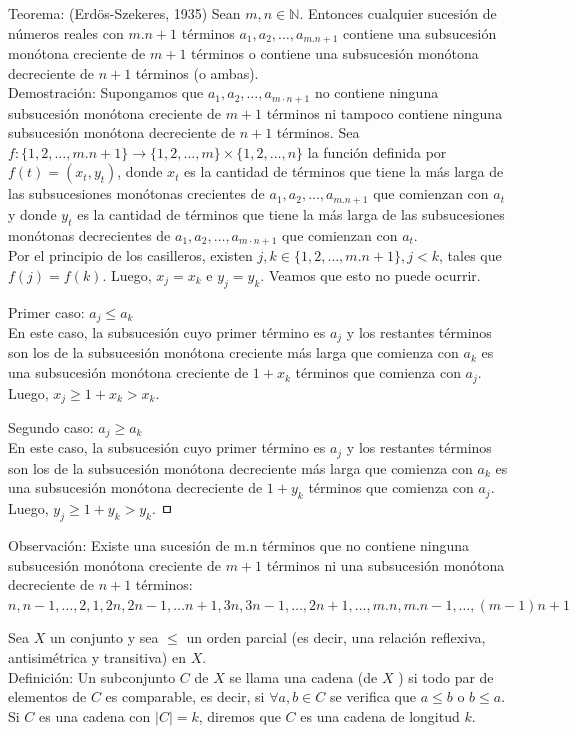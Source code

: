 \documentclass[10pt]{article}
\begin{document}
Teorema: (Erdös-Szekeres, 1935) Sean $m, n \in \mathbb{N}$. Entonces cualquier sucesión de números reales con $m . n+1$ términos $a_{1}, a_{2}, \ldots, a_{m . n+1}$ contiene una subsucesión monótona creciente de $m+1$ términos o contiene una subsucesión monótona decreciente de $n+1$ términos (o ambas).\\
Demostración: Supongamos que $a_{1}, a_{2}, \ldots, a_{m \cdot n+1}$ no contiene ninguna subsucesión monótona creciente de $m+1$ términos ni tampoco contiene ninguna subsucesión monótona decreciente de $n+1$ términos. Sea $f:\{1,2, \ldots, m . n+1\} \longrightarrow\{1,2, \ldots, m\} \times\{1,2, \ldots, n\}$ la función definida por $f(t)=\left(x_{t}, y_{t}\right)$, donde $x_{t}$ es la cantidad de términos que tiene la más larga de las subsucesiones monótonas crecientes de $a_{1}, a_{2}, \ldots, a_{m . n+1}$ que comienzan con $a_{t}$ y donde $y_{t}$ es la cantidad de términos que tiene la más larga de las subsucesiones monótonas decrecientes de $a_{1}, a_{2}, \ldots, a_{m \cdot n+1}$ que comienzan con $a_{t}$.\\
Por el principio de los casilleros, existen $j, k \in\{1,2, \ldots, m . n+1\}, j<k$, tales que $f(j)=f(k)$. Luego, $x_{j}=x_{k}$ e $y_{j}=y_{k}$. Veamos que esto no puede ocurrir.

Primer caso: $a_{j} \leq a_{k}$\\
En este caso, la subsucesión cuyo primer término es $a_{j}$ y los restantes términos son los de la subsucesión monótona creciente más larga que comienza con $a_{k}$ es una subsucesión monótona creciente de $1+x_{k}$ términos que comienza con $a_{j}$. Luego, $x_{j} \geq 1+x_{k}>x_{k}$.

Segundo caso: $a_{j} \geq a_{k}$\\
En este caso, la subsucesión cuyo primer término es $a_{j}$ y los restantes términos son los de la subsucesión monótona decreciente más larga que comienza con $a_{k}$ es una subsucesión monótona decreciente de $1+y_{k}$ términos que comienza con $a_{j}$. Luego, $y_{j} \geq 1+y_{k}>y_{k}$. ㅁ

Observación: Existe una sucesión de m.n términos que no contiene ninguna subsucesión monótona creciente de $m+1$ términos ni una subsucesión monótona decreciente de $n+1$ términos:\\
$n, n-1, \ldots, 2,1,2 n, 2 n-1, \ldots n+1,3 n, 3 n-1, \ldots, 2 n+1, \ldots, m . n, m . n-1, \ldots,(m-1) n+1$

Sea $X$ un conjunto y sea $\leq$ un orden parcial (es decir, una relación reflexiva, antisimétrica y transitiva) en $X$.\\
Definición: Un subconjunto $C$ de $X$ se llama una cadena (de $X$ ) si todo par de elementos de $C$ es comparable, es decir, si $\forall a, b \in C$ se verifica que $a \leq b$ o $b \leq a$. Si $C$ es una cadena con $|C|=k$, diremos que $C$ es una cadena de longitud $k$.
\end{document}
